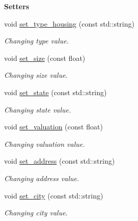 \begin{Indent}{\bf Setters}\par
\begin{DoxyCompactItemize}
\item 
void \hyperlink{class_c_housing_aa3d4063bf93f2cdbddd9ae16f0363893}{set\+\_\+type\+\_\+housing} (const std\+::string)
\begin{DoxyCompactList}\small\item\em Changing type value. \end{DoxyCompactList}\item 
void \hyperlink{class_c_housing_ab6a8eaa28937e9728c939d54f1f101c8}{set\+\_\+size} (const float)
\begin{DoxyCompactList}\small\item\em Changing size value. \end{DoxyCompactList}\item 
void \hyperlink{class_c_housing_ab8ef7d502de4f36057639debd22a5d32}{set\+\_\+state} (const std\+::string)
\begin{DoxyCompactList}\small\item\em Changing state value. \end{DoxyCompactList}\item 
void \hyperlink{class_c_housing_a6542b420e5405667818649fc6a4131fc}{set\+\_\+valuation} (const float)
\begin{DoxyCompactList}\small\item\em Changing valuation value. \end{DoxyCompactList}\item 
void \hyperlink{class_c_housing_a340ba44629ad45a5739af0a5f79c78da}{set\+\_\+address} (const std\+::string)
\begin{DoxyCompactList}\small\item\em Changing address value. \end{DoxyCompactList}\item 
void \hyperlink{class_c_housing_abc5cac82dfc78666381d49e6aa3140fb}{set\+\_\+city} (const std\+::string)
\begin{DoxyCompactList}\small\item\em Changing city value. \end{DoxyCompactList}\end{DoxyCompactItemize}
\end{Indent}
